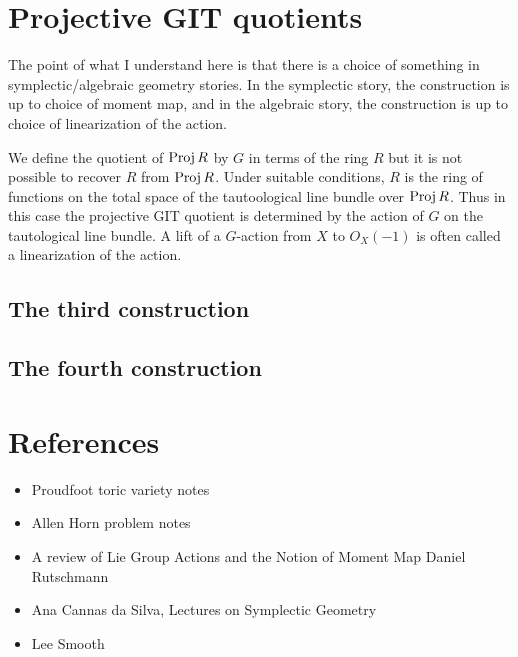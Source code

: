 \documentclass[12pt]{article}
\begin{document}
\section{Projective GIT quotients}
The point of what I understand here is that there is a choice of something in symplectic/algebraic geometry stories.
In the symplectic story, the construction is up to choice of moment map, and in the algebraic story, the construction
is up to choice of linearization of the action. 

\hfill

\begin{remark}
    We define the quotient of $\operatorname{Proj} R$ by $G$ 
in terms of the ring $R$ but it is not possible to recover $R$ from $\operatorname{Proj} R$. Under suitable conditions,
$R$ is the ring of functions on the total space of the tautoological line bundle over $\operatorname{Proj} R$. Thus
in this case the projective GIT quotient is determined by the action of $G$ on the tautological line bundle.
A lift of a $G$-action from $X$ to $O_X(-1)$ is often called a linearization of the action.
\end{remark}
\subsection{The third construction}

\subsection{The fourth construction}

\section{References}
\begin{itemize}
	\item Proudfoot toric variety notes
	\item Allen Horn problem notes
	\item A review of Lie Group Actions and the Notion of Moment Map Daniel Rutschmann
	\item Ana Cannas da Silva, Lectures on Symplectic Geometry
	\item Lee Smooth
\end{itemize}
\end{document}
